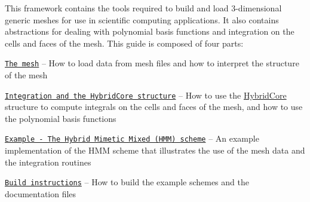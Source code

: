 This framework contains the tools required to build and load 3-\/dimensional generic meshes for use in scientific computing applications. It also contains abstractions for dealing with polynomial basis functions and integration on the cells and faces of the mesh. This guide is composed of four parts\+:


\begin{DoxyItemize}
\item \href{#mesh}{\tt The mesh} -- How to load data from mesh files and how to interpret the structure of the mesh
\item \href{#integration}{\tt Integration and the Hybrid\+Core structure} -- How to use the \hyperlink{classMeshFramework2D_1_1HybridCore}{Hybrid\+Core} structure to compute integrals on the cells and faces of the mesh, and how to use the polynomial basis functions
\item \href{#hmm}{\tt Example -\/ The Hybrid Mimetic Mixed (H\+MM) scheme} -- An example implementation of the H\+MM scheme that illustrates the use of the mesh data and the integration routines
\item \href{#build}{\tt Build instructions} -- How to build the example schemes and the documentation files 
\end{DoxyItemize}